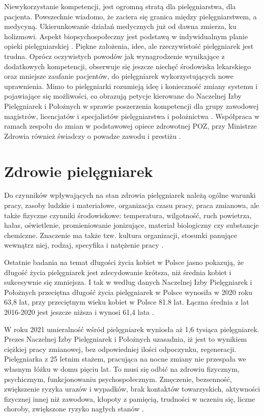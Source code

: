 \documentclass[a4paper,12pt,twoside,openright]{mwrep}
\begin{document}
Niewykorzystanie  kompetencji, jest ogromną stratą dla pielęgniarstwa, dla pacjenta. Powszechnie wiadomo, że zaciera się granica między pielęgniarstwem, a medycyną. Ukierunkowanie działań medycznych już od dawna zmierza, ku holizmowi. Aspekt biopsychospołeczny jest podstawą w indywidualnym planie opieki pielęgniarskiej \cite{dorota}. Piękne założenia, idee, ale rzeczywistość pielęgniarek jest trudna. Oprócz oczywistych powodów jak wynagrodzenie wynikające z dodatkowych kompetencji, obserwuje się jeszcze niechęć środowiska lekarskiego oraz mniejsze zaufanie pacjentów, do pielęgniarek wykorzystujących nowe uprawnienia. Mimo to pielęgniarki rozumieją ideę i konieczność zmiany systemu i  pojawiające się możliwości, co obrazują petycje kierowane do Naczelnej Izby Pielęgniarek i Położnych w sprawie poszerzenia kompetencji dla grupy zawodowej magistrów, licencjatów i specjalistów pielęgniarstwa i położnictwa \cite{petycja}. Współpraca w ramach zespołu do zmian w podstawowej opiece zdrowotnej POZ, przy Ministrze Zdrowia również świadczy o powadze zawodu i prestiżu \cite{poz}.

\section{Zdrowie pielęgniarek}
\label{sectionZdrowiePielegniarek}
Do czynników wpływających na stan zdrowia pielęgniarek należą ogólne warunki pracy, zasoby ludzkie i materiałowe, organizacja czasu pracy,  praca zmianowa, ale także fizyczne czynniki środowiskowe: temperatura, wilgotność, ruch powietrza, hałas, oświetlenie, promieniowanie jonizujące, materiał biologiczny czy substancje chemiczne. Znaczenie ma także tzw. kultura organizacji, stosunki panujące wewnątrz niej, rodzaj, specyfika i natężenie pracy \cite{obciazenia}.

Ostatnie badania na temat długości życia kobiet w Polsce jasno pokazują, że długość życia pielęgniarek jest zdecydowanie krótsza, niż średnia kobiet i sukcesywnie się zmniejsza. I tak w według danych Naczelnej Izby Pielęgniarek i Położnych przeciętna długość życia pielęgniarek w Polsce wynosiła w 2020 roku 63,8 lat, przy przeciętnym wieku kobiet w Polsce 81.8 lat. Łączna średnia z lat 2016-2020 jest jeszcze niższa i wynosi 61,4 lata \cite{statystyka}.

W roku 2021 umieralność wśród pielęgniarek wyniosła aż 1,6 tysiąca pielęgniarek. Prezes Naczelnej Izby Pielęgniarek i Położnych uzasadnia, iż jest to wynikiem ciężkiej pracy zmianowej, bez odpowiedniej ilości odpoczynku, regeneracji. Pielęgniarka z 25 letnim stażem, pracująca na nocne zmiany nie przespała we własnym łóżku w domu pięciu lat. To musi się odbić na zdrowiu fizycznym, psychicznym, funkcjonowaniu psychospołecznym. Zmęczenie, bezsenność, zwiększenie ryzyka urazów i wypadków, brak kontaktów towarzyskich, aktywności fizycznej innej niż zawodowa, kłopoty z pamięcią, trudności w uczeniu się, liczne choroby, zwiększone ryzyko nagłych stanów \cite{zgony}.
\end{document}
